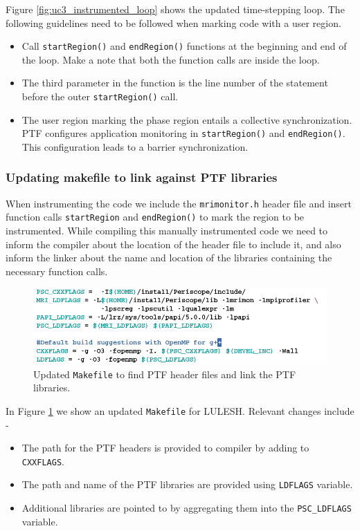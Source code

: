Figure \ref{fig:uc3_instrumented_loop} shows the updated time-stepping loop. The following guidelines need to be followed when marking code with a user region.
	
	\begin{itemize}
		\item Call {\tt startRegion()} and {\tt endRegion()} functions at the beginning and end of the loop. Make a note that both the function calls are inside the loop.
		\item The third parameter in the function is the line number of the statement before the outer {\tt startRegion()} call.
		\item The user region marking the phase region entails a collective synchronization. PTF configures application monitoring in {\tt startRegion()} and {\tt endRegion()}. This configuration leads to a barrier synchronization. 
	\end{itemize}
	
\subsubsection{Updating makefile to link against PTF libraries}

When instrumenting the code we include the {\tt mrimonitor.h} header file and insert function calls {\tt startRegion} and {\tt endRegion()} to mark the region to be instrumented. While compiling this manually instrumented code we need to inform the compiler about the location of the header file to include it, and also inform the linker about the name and location of the libraries containing the necessary function calls.
	
	\begin{figure}[H]
		\centering
		\includegraphics[scale=.65]{../BPG/images/uc3_makefile.png}
		\caption{Updated {\tt Makefile} to find PTF header files and link the PTF libraries.}
		\label{fig:uc3_makefile}
	\end{figure}
	

In Figure \ref{fig:uc3_makefile} we show an updated {\tt Makefile} for LULESH. Relevant changes include -
	
	\begin{itemize}
		\item The path for the PTF headers is provided to compiler by adding to {\tt CXXFLAGS}.
		\item The path and name of the PTF libraries are provided using {\tt LDFLAGS} variable.
		\item Additional libraries  are pointed to by aggregating them into the {\tt PSC\_LDFLAGS} variable.
	\end{itemize}
	
